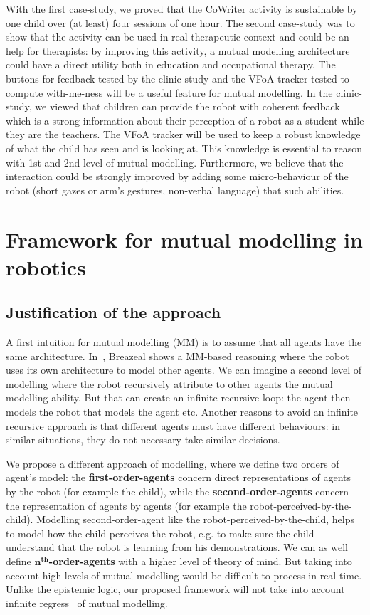 \documentclass[10pt,a4paper]{article}
\begin{document}
With the first case-study, we proved that the CoWriter activity is sustainable by one child over (at least) four sessions of one hour. The second case-study was to show that the activity can be used in real therapeutic context and could be an help for therapists: by improving this activity, a mutual modelling architecture could have a direct utility both in education and occupational therapy. The buttons for feedback tested by the clinic-study and the VFoA tracker tested to compute with-me-ness will be a useful feature for mutual modelling. In the clinic-study, we viewed that children can provide the robot with coherent feedback which is a strong information about their perception of a robot as a student while they are the teachers. The VFoA tracker will be used to keep a robust knowledge of what the child has seen and is looking at. This knowledge is essential to reason with 1st and 2nd level of mutual modelling. Furthermore, we believe that the interaction could be strongly improved by adding some micro-behaviour of the robot (short gazes or arm's gestures, non-verbal language) that such abilities.

\section{Framework for mutual modelling in robotics}\label{framework}

\subsection{Justification of the approach}

A first intuition for mutual modelling (MM) is to assume that all agents have the same architecture. In~\cite{breazeal2006using}, Breazeal shows a MM-based reasoning where the robot uses its own architecture to model other agents. We can imagine a second level of modelling where the robot recursively attribute to other agents the mutual modelling ability. But that can create an infinite recursive loop: the agent then models the robot that models the agent etc. Another reasons to avoid an infinite recursive approach is that different agents must have different behaviours: in similar situations, they do not necessary take similar decisions. 

We propose a different approach of modelling, where we define two orders of agent's model: the \textbf{first-order-agents} concern direct representations of agents by the robot (for example the child), while the \textbf{second-order-agents} concern the representation of agents by agents (for example the robot-perceived-by-the-child). 
Modelling second-order-agent like the robot-perceived-by-the-child, helps to model how the child perceives the robot, e.g. to make sure the child understand that the robot is learning from his demonstrations. 
We can as well define $\textbf{n}^{\textbf{th}}$\textbf{-order-agents} with a higher level of theory of mind. But taking into account high levels of mutual modelling would be difficult to process in real time. Unlike the epistemic logic, our proposed framework will not take into account infinite regress~\cite{clark1991grounding} of mutual modelling.
\end{document}
